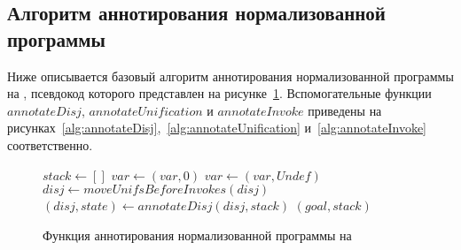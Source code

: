 \subsection{Алгоритм аннотирования нормализованной программы}
\label{lab:coreAnn}

Ниже описывается базовый алгоритм аннотирования нормализованной программы на \miniKanren{}, псевдокод которого представлен на рисунке~\ref{alg:annotate}.
Вспомогательные функции $annotateDisj$, $annotateUnification$ и $annotateInvoke$ приведены на рисунках~\ref{alg:annotateDisj},~\ref{alg:annotateUnification} и~\ref{alg:annotateInvoke} соответственно.


\begin{figure}[h!]
  \begin{center}
  \begin{minipage}{\textwidth}
\begin{algorithm}[H]
  \begin{algorithmic}[1]
      \State $stack \gets []$
          \State $var \gets (var, 0)$
        \Else
          \State $var \gets (var, Undef)$
        \EndIf
      \EndFor
        \State $disj \gets moveUnifsBeforeInvokes(disj)$
        \State $(disj, state) \gets annotateDisj(disj, stack)$
      \EndFor
      \State \returnkw $(goal, stack)$
    \EndFunction
  \end{algorithmic}
\end{algorithm}
  \end{minipage}
  \end{center}
  \caption{Функция аннотирования нормализованной программы на \miniKanren{}}
  \label{alg:annotate}
\end{figure}


